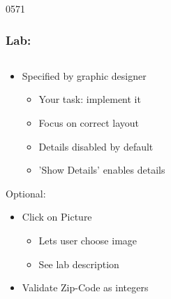 \begin{slide}{0571}\frametitle{Lab: }
\label{config_dialog-part1}
                                        
\begin{columns}[t]
  \begin{column}{7cm} 
    \begin{itemize}     
      \item Specified by graphic designer
      \begin{itemize}
        \item Your task: implement it
        \item Focus on correct layout
        \item Details disabled by default
        \item 'Show Details' enables details
     \end{itemize}
   \end{itemize}
     \vfill
     Optional: 
     \begin{itemize}
       \item Click on Picture 
       \begin{itemize}
       \item Lets user choose image
       \item See lab description
       \end{itemize}             
       \item Validate Zip-Code as integers
    \end{itemize}
  \end{column}
  \begin{column}{4cm}
  \end{column}
\end{columns}
\end{slide}


